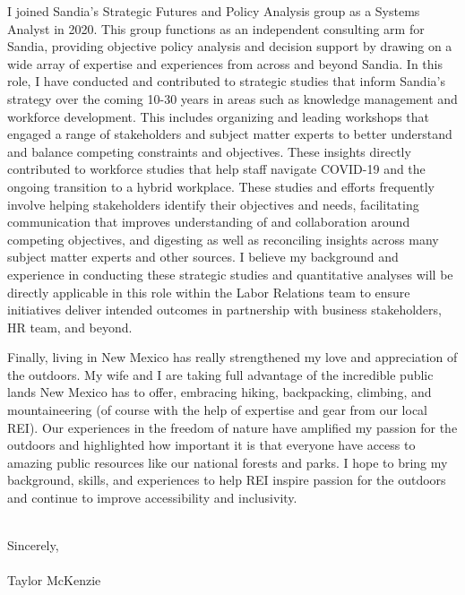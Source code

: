 \documentclass[10pt]{article}
\begin{document}
I joined Sandia's Strategic Futures and Policy Analysis group as a Systems Analyst in 2020. This group functions as an independent consulting arm for Sandia, providing objective policy analysis and decision support by drawing on a wide array of expertise and experiences from across and beyond Sandia. In this role, I have conducted and contributed to strategic studies that inform Sandia's strategy over the coming 10-30 years in areas such as knowledge management and workforce development. This includes organizing and leading workshops that engaged a range of stakeholders and subject matter experts to better understand and balance competing constraints and objectives. These insights directly contributed to workforce studies that help staff navigate COVID-19 and the ongoing transition to a hybrid workplace. These studies and efforts frequently involve helping stakeholders identify their objectives and needs, facilitating communication that improves understanding of and collaboration around competing objectives, and digesting as well as reconciling insights across many subject matter experts and other sources. I believe my background and experience in conducting these strategic studies and quantitative analyses will be directly applicable in this role within the Labor Relations team to ensure initiatives deliver intended outcomes in partnership with business stakeholders, HR team, and beyond.

Finally, living in New Mexico has really strengthened my love and appreciation of the outdoors. My wife and I are taking full advantage of the incredible public lands New Mexico has to offer, embracing hiking, backpacking, climbing, and mountaineering (of course with the help of expertise and gear from our local REI). Our experiences in the freedom of nature have amplified my passion for the outdoors and highlighted how important it is that everyone have access to amazing public resources like our national forests and parks. I hope to bring my background, skills, and experiences to help REI inspire passion for the outdoors and continue to improve accessibility and inclusivity.

\noindent \\Sincerely,\\\\
Taylor McKenzie
\end{document}
